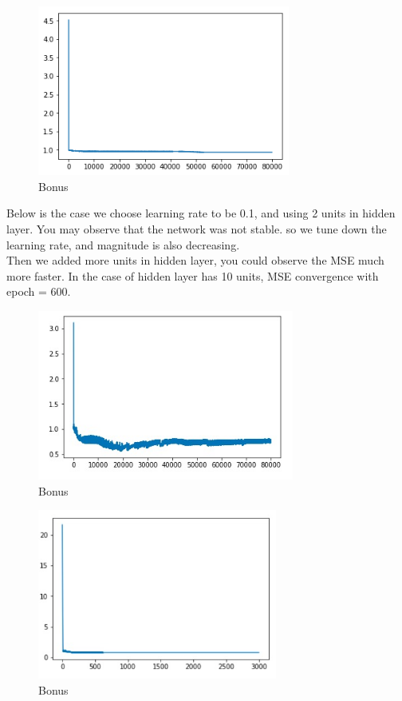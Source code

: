 \documentclass[a4paper]{article}
\begin{document}
\begin{figure}[h]
  \centering
    \includegraphics[height = 2.2in]{Bonus.png}
    \caption{Bonus}
\end{figure}
\newpage
Below is the case we choose learning rate to be 0.1, and using 2 units in hidden layer. You may observe that the network was not stable. so we tune down the learning rate, and magnitude is also decreasing.\\
Then we added more units in hidden layer, you could observe the MSE much more faster. In the case of hidden layer has 10 units, MSE convergence with epoch = 600.\\
\begin{figure}[h]
  \centering
    \includegraphics[height = 2.2in]{IMG_1217.JPG}
    \caption{Bonus}
\end{figure}
\begin{figure}[h]
  \centering
    \includegraphics[height = 2.2in]{IMG_1218.JPG}
    \caption{Bonus}
\end{figure}
\end{document}
